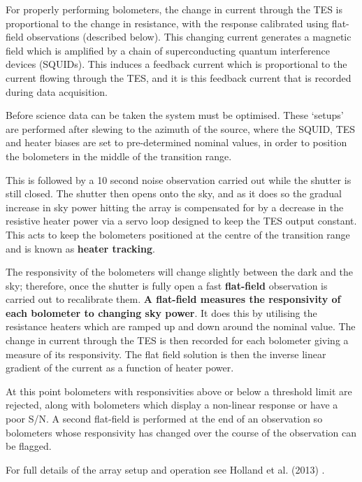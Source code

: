 \documentclass[twoside,11pt]{article}
\renewcommand{\_}{\texttt{\symbol{95}}}
\begin{document}
For properly performing bolometers, the change in current through the
TES is proportional to the change in resistance, with the response
calibrated using flat-field observations (described below). This
changing current generates a magnetic field which is amplified by a
chain of superconducting quantum interference devices (SQUIDs). This
induces a feedback current which is proportional to the current
flowing through the TES, and it is this feedback current that is
recorded during data acquisition.

Before science data can be taken the system must be optimised. These
`setups' are performed after slewing to the azimuth of the source,
where the SQUID, TES and heater biases are set to pre-determined
nominal values, in order to position the bolometers in the middle of
the transition range.

This is followed by a 10 second noise observation carried out while
the shutter is still closed. The shutter then opens onto the sky, and
as it does so the gradual increase in sky power hitting the array is
compensated for by a decrease in the resistive heater power via a
servo loop designed to keep the TES output constant. This acts to keep
the bolometers positioned at the centre of the transition range and is
known as \textbf{heater tracking}.

The responsivity of the bolometers will change slightly between the
dark and the sky; therefore, once the shutter is fully open a fast
\textbf{flat-field} observation is carried out to recalibrate them.
\textbf{A flat-field measures the responsivity of each bolometer to
changing sky power}. It does this by utilising the resistance heaters
which are ramped up and down around the nominal value. The change in
current through the TES is then recorded for each bolometer giving a
measure of its responsivity. The flat field solution is then the
inverse linear gradient of the current as a function of heater power.

At this point bolometers with responsivities above or below a
threshold limit are rejected, along with bolometers which display a
non-linear response or have a poor S/N. A second flat-field is
performed at the end of an observation so bolometers whose
responsivity has changed over the course of the observation can be
flagged.

For full details of the array setup and operation see Holland et al.
(2013) \cite{s2main}.
\end{document}
